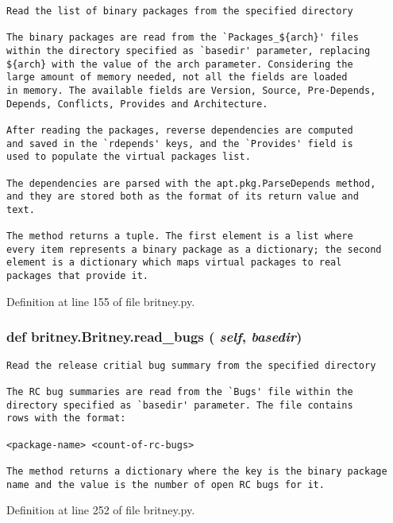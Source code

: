 \footnotesize\begin{verbatim}Read the list of binary packages from the specified directory

The binary packages are read from the `Packages_${arch}' files
within the directory specified as `basedir' parameter, replacing
${arch} with the value of the arch parameter. Considering the
large amount of memory needed, not all the fields are loaded
in memory. The available fields are Version, Source, Pre-Depends,
Depends, Conflicts, Provides and Architecture.

After reading the packages, reverse dependencies are computed
and saved in the `rdepends' keys, and the `Provides' field is
used to populate the virtual packages list.

The dependencies are parsed with the apt.pkg.ParseDepends method,
and they are stored both as the format of its return value and
text.

The method returns a tuple. The first element is a list where
every item represents a binary package as a dictionary; the second
element is a dictionary which maps virtual packages to real
packages that provide it.
\end{verbatim}
\normalsize
 

Definition at line 155 of file britney.py.
\subsubsection{\setlength{\rightskip}{0pt plus 5cm}def britney.Britney.read\_\-bugs ( {\em self},  {\em basedir})}\label{classbritney_1_1Britney_6c777aae69e7bec2efebaf23ddd4a86c}




\footnotesize\begin{verbatim}Read the release critial bug summary from the specified directory

The RC bug summaries are read from the `Bugs' file within the
directory specified as `basedir' parameter. The file contains
rows with the format:

<package-name> <count-of-rc-bugs>

The method returns a dictionary where the key is the binary package
name and the value is the number of open RC bugs for it.
\end{verbatim}
\normalsize
 

Definition at line 252 of file britney.py.
